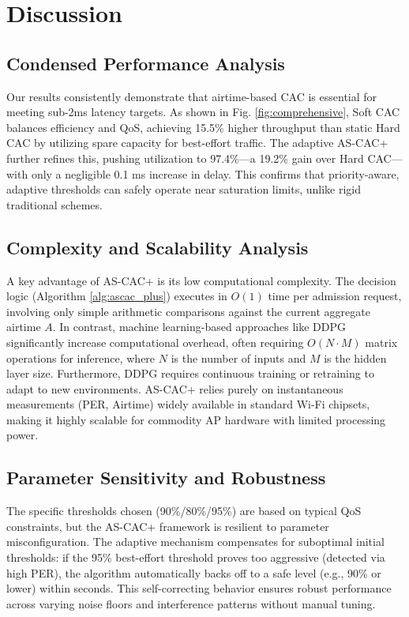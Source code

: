 \documentclass[conference]{IEEEtran}
\begin{document}
\section{Discussion}

\subsection{Condensed Performance Analysis}

Our results consistently demonstrate that airtime-based CAC is essential for meeting sub-2ms latency targets. As shown in Fig. \ref{fig:comprehensive}, Soft CAC balances efficiency and QoS, achieving 15.5\% higher throughput than static Hard CAC by utilizing spare capacity for best-effort traffic. The adaptive AS-CAC+ further refines this, pushing utilization to 97.4\%—a 19.2\% gain over Hard CAC—with only a negligible 0.1 ms increase in delay. This confirms that priority-aware, adaptive thresholds can safely operate near saturation limits, unlike rigid traditional schemes.

\subsection{Complexity and Scalability Analysis}

A key advantage of AS-CAC+ is its low computational complexity. The decision logic (Algorithm \ref{alg:ascac_plus}) executes in $O(1)$ time per admission request, involving only simple arithmetic comparisons against the current aggregate airtime $A$. In contrast, machine learning-based approaches like DDPG \cite{18} significantly increase computational overhead, often requiring $O(N \cdot M)$ matrix operations for inference, where $N$ is the number of inputs and $M$ is the hidden layer size. Furthermore, DDPG requires continuous training or retraining to adapt to new environments. AS-CAC+ relies purely on instantaneous measurements (PER, Airtime) widely available in standard Wi-Fi chipsets, making it highly scalable for commodity AP hardware with limited processing power.

\subsection{Parameter Sensitivity and Robustness}

The specific thresholds chosen (90\%/80\%/95\%) are based on typical QoS constraints, but the AS-CAC+ framework is resilient to parameter misconfiguration. The adaptive mechanism compensates for suboptimal initial thresholds: if the 95\% best-effort threshold proves too aggressive (detected via high PER), the algorithm automatically backs off to a safe level (e.g., 90\% or lower) within seconds. This self-correcting behavior ensures robust performance across varying noise floors and interference patterns without manual tuning.
\end{document}
